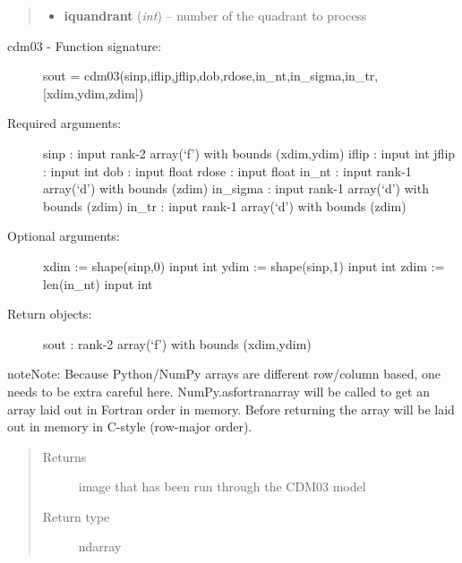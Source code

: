\documentclass[a4paper,11pt,english]{sphinxmanual}
\begin{document}
\begin{fulllineitems}
\begin{fulllineitems}
\begin{quote}
\begin{description}
\begin{itemize}
\item {} 
\textbf{iquandrant} (\emph{int}) -- number of the quadrant to process

\end{itemize}

\end{description}\end{quote}
\begin{description}
\item[{cdm03 - Function signature:}] \leavevmode
sout = cdm03(sinp,iflip,jflip,dob,rdose,in\_nt,in\_sigma,in\_tr,{[}xdim,ydim,zdim{]})

\item[{Required arguments:}] \leavevmode
sinp : input rank-2 array(`f') with bounds (xdim,ydim)
iflip : input int
jflip : input int
dob : input float
rdose : input float
in\_nt : input rank-1 array(`d') with bounds (zdim)
in\_sigma : input rank-1 array(`d') with bounds (zdim)
in\_tr : input rank-1 array(`d') with bounds (zdim)

\item[{Optional arguments:}] \leavevmode
xdim := shape(sinp,0) input int
ydim := shape(sinp,1) input int
zdim := len(in\_nt) input int

\item[{Return objects:}] \leavevmode
sout : rank-2 array(`f') with bounds (xdim,ydim)

\end{description}

\begin{notice}{note}{Note:}
Because Python/NumPy arrays are different row/column based, one needs
to be extra careful here. NumPy.asfortranarray will be called to get
an array laid out in Fortran order in memory. Before returning the
array will be laid out in memory in C-style (row-major order).
\end{notice}
\begin{quote}\begin{description}
\item[{Returns}] \leavevmode
image that has been run through the CDM03 model

\item[{Return type}] \leavevmode
ndarray

\end{description}\end{quote}

\end{fulllineitems}



\end{fulllineitems}
\end{document}
